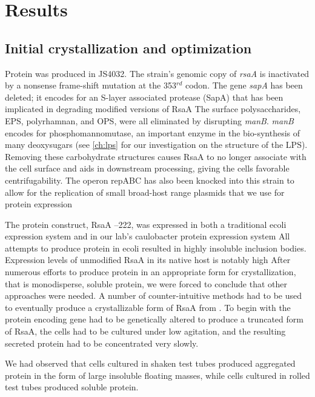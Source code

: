 \section{Results}\label{sec:crystal-results}

\subsection{Initial crystallization and optimization}\label{sec:init-cryst-optim} 
 Protein was produced in JS4032. The strain's genomic copy of \textit{rsaA} is inactivated by a nonsense frame-shift mutation at the 353$^{rd}$ codon. The gene \textit{sapA} has been deleted; it encodes for an S-layer associated protease (SapA) that has been implicated in degrading modified versions of RsaA The surface polysaccharides, \ac{EPS}, polyrhamnan, and \ac{OPS}, were all eliminated by disrupting \textit{manB}. \textit{manB} encodes for phosphomannomutase, an important enzyme in the bio-synthesis of many deoxysugars (see \cref{ch:lps} for our investigation on the structure of the \ac{LPS}). Removing these carbohydrate structures causes RsaA to no longer associate with the cell surface and aids in downstream processing, giving the cells favorable centrifugability. The operon repABC has also been knocked into this strain to allow for the replication of small broad-host range plasmids that we use for protein expression

The protein construct, RsaA --222, was expressed in both a traditional
\acl{ecoli} expression system and in our lab's \ac{caulobacter}
protein expression system
 All attempts to produce protein in \ac{ecoli}
resulted in highly insoluble inclusion bodies.
 Expression levels of unmodified RsaA in its native host is notably high 
After numerous efforts to produce protein in an appropriate form for
crystallization, that is monodisperse, soluble protein, we were forced to conclude that other approaches were needed. A number of
counter-intuitive methods had to be used to eventually produce a crystallizable form of
RsaA from \caulobacter. To begin with the protein encoding gene had to be genetically altered
to produce a truncated form of RsaA, the cells had to be cultured under low
agitation, and the resulting secreted protein had to be concentrated very slowly.

We had observed that cells cultured in shaken test tubes produced
aggregated protein in the form of large insoluble floating masses, while cells cultured in rolled test tubes produced soluble
protein.

